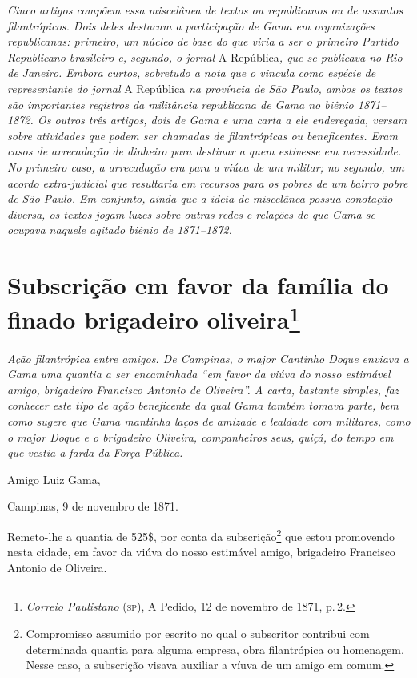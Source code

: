 \begin{argumento}
\emph{Cinco artigos compõem essa miscelânea de textos ou republicanos ou
de assuntos filantrópicos. Dois deles destacam a participação de Gama em
organizações republicanas: primeiro, um núcleo de base do que viria a
ser o primeiro Partido Republicano brasileiro e, segundo, o jornal} A
República\emph{, que se publicava no Rio de Janeiro. Embora curtos,
sobretudo a nota que o vincula como espécie de representante do jornal}
A República \emph{na província de São Paulo, ambos os textos são
importantes registros da militância republicana de Gama no biênio
1871--1872. Os outros três artigos, dois de Gama e uma carta a ele
endereçada, versam sobre atividades que podem ser chamadas de
filantrópicas ou beneficentes. Eram casos de arrecadação de dinheiro
para destinar a quem estivesse em necessidade. No primeiro caso, a
arrecadação era para a viúva de um militar; no segundo, um acordo
extra-judicial que resultaria em recursos para os pobres de um bairro
pobre de São Paulo. Em conjunto, ainda que a ideia de miscelânea possua
conotação diversa, os textos jogam luzes sobre outras redes e relações
de que Gama se ocupava naquele agitado biênio de 1871--1872.}
\end{argumento}

\chapter{Subscrição em favor da família do finado brigadeiro oliveira\footnote{\emph{Correio Paulistano} (\textsc{sp}), A Pedido, 12 de novembro de 1871,
  p.\,2.}} %

\begin{didascalia}
\emph{Ação filantrópica entre amigos. De Campinas, o major Cantinho
Doque enviava a Gama uma quantia a ser encaminhada ``em favor da viúva do
nosso estimável amigo, brigadeiro Francisco Antonio de Oliveira''. A
carta, bastante simples, faz conhecer este tipo de ação beneficente da
qual Gama também tomava parte, bem como sugere que Gama mantinha laços
de amizade e lealdade com militares, como o major Doque e o brigadeiro
Oliveira, companheiros seus, quiçá, do tempo em que vestia a farda da
Força Pública.}
\end{didascalia}


Amigo Luiz Gama,

Campinas, 9 de novembro de 1871.

Remeto-lhe a quantia de 525\$, por conta da subscrição\footnote{
  Compromisso assumido por escrito no qual o subscritor contribui com
  determinada quantia para alguma empresa, obra filantrópica ou
  homenagem. Nesse caso, a subscrição visava auxiliar a víuva de um
  amigo em comum.} que estou promovendo nesta cidade, em favor da viúva
do nosso estimável amigo, brigadeiro Francisco Antonio de Oliveira.


